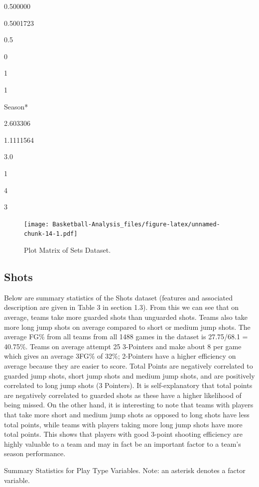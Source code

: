\documentclass[]{book}
\begin{document}
0.500000

0.5001723

0.5

0

1

1

Season*

2.603306

1.1111564

3.0

1

4

3

\begin{figure}
\centering
\texttt{[image: Basketball-Analysis\_files/figure-latex/unnamed-chunk-14-1.pdf]}
\caption{\label{fig:unnamed-chunk-14}Plot Matrix of Sets Dataset.}
\end{figure}

\hypertarget{shots-1}{%
\subsection{Shots}\label{shots-1}}

Below are summary statistics of the Shots dataset (features and associated description are given in Table 3 in section 1.3). From this we can see that on average, teams take more guarded shots than unguarded shots. Teams also take more long jump shots on average compared to short or medium jump shots. The average FG\% from all teams from all 1488 games in the dataset is 27.75/68.1 = 40.75\%. Teams on average attempt 25 3-Pointers and make about 8 per game which gives an average 3FG\% of 32\%; 2-Pointers have a higher efficiency on average because they are easier to score.
Total Points are negatively correlated to guarded jump shots, short jump shots and medium jump shots, and are positively correlated to long jump shots (3 Pointers). It is self-explanatory that total points are negatively correlated to guarded shots as these have a higher likelihood of being missed. On the other hand, it is interesting to note that teams with players that take more short and medium jump shots as opposed to long shots have less total points, while teams with players taking more long jump shots have more total points. This shows that players with good 3-point shooting efficiency are highly valuable to a team and may in fact be an important factor to a team's season performance.

\label{tab:unnamed-chunk-15}Summary Statistics for Play Type Variables. Note: an asterisk denotes a factor variable.
\end{document}
